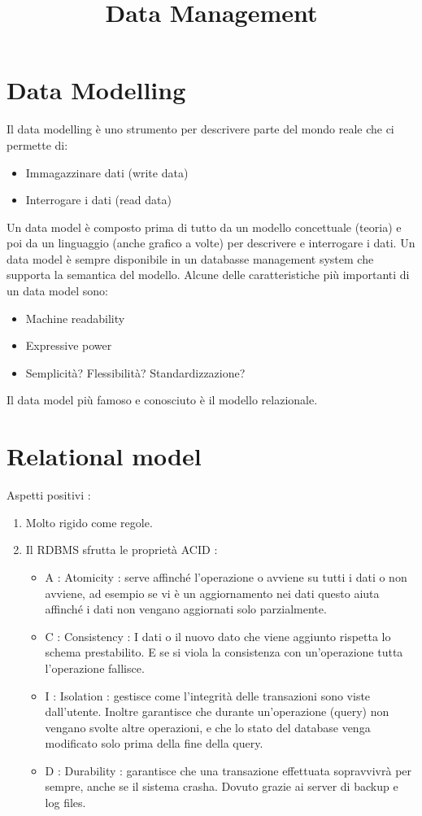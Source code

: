 \documentclass[a4page, 11pt]{article}
\title{Data Management}
\author{}
\date{}
\begin{document}
\maketitle

\section{Data Modelling}
Il data modelling è uno strumento per descrivere parte del mondo reale che ci permette di:
\begin{itemize}[noitemsep]
\item Immagazzinare dati (write data)
\item Interrogare i dati (read data)
\end{itemize}
Un data model è composto prima di tutto da un modello concettuale (teoria) e poi da un linguaggio (anche grafico a volte) per descrivere e interrogare i dati. Un data model è sempre disponibile in un databasse management system che supporta la semantica del modello. Alcune delle caratteristiche più importanti di un data model sono:
\begin{itemize}[noitemsep]
\item Machine readability
\item Expressive power
\item Semplicità? Flessibilità? Standardizzazione?
\end{itemize}
Il data model più famoso  e conosciuto è il modello relazionale.
\section{Relational model}

Aspetti positivi :

\begin{enumerate}[noitemsep]
	 
	\item
	Molto rigido come regole.
	\item
	Il RDBMS sfrutta le proprietà ACID :
	\begin{itemize}
		
		\item
		A : Atomicity : serve affinché l'operazione o avviene su tutti i dati o non avviene, ad esempio se vi è un aggiornamento nei dati questo aiuta affinché i dati non vengano aggiornati solo parzialmente.
		\item
		C : Consistency : I dati o il nuovo dato che viene aggiunto rispetta lo schema prestabilito. E se si viola la consistenza con un'operazione tutta l'operazione fallisce.
		\item
		I : Isolation : gestisce come l'integrità delle transazioni sono viste dall'utente. Inoltre garantisce che durante un'operazione (query) non vengano svolte altre operazioni, e che lo stato del database venga modificato solo prima della fine della query.
		\item
		D : Durability : garantisce che una transazione effettuata sopravvivrà per sempre, anche se il sistema crasha. Dovuto grazie ai server di
		backup e log files.
	\end{itemize}
\end{enumerate}
\end{document}
